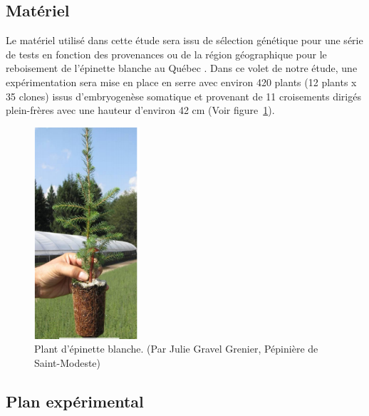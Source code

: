 \documentclass[a4paper,12pt]{report}
\begin{document}
\subsection*{Matériel}

Le matériel utilisé dans cette étude sera issu de sélection génétique pour une série de tests en fonction des provenances ou de la région géographique pour le reboisement de l'épinette blanche au Québec \citep{Beaulieu1996}. Dans ce volet de notre étude, une expérimentation sera mise en place en serre avec environ 420 plants (12 plants x 35 clones) issus d'embryogenèse somatique et provenant de 11 croisements dirigés plein-frères avec une hauteur d'environ 42 cm (Voir figure~\ref{plant}).  \\


\begin{figure}
	
	\centering
	\includegraphics[width=0.35\textwidth]{plant_epinette.png}
	\caption{Plant d'épinette blanche. (Par Julie Gravel Grenier, Pépinière de Saint-Modeste)}
	\label{plant}	
	
\end{figure}

\subsection*{Plan expérimental}
\end{document}
